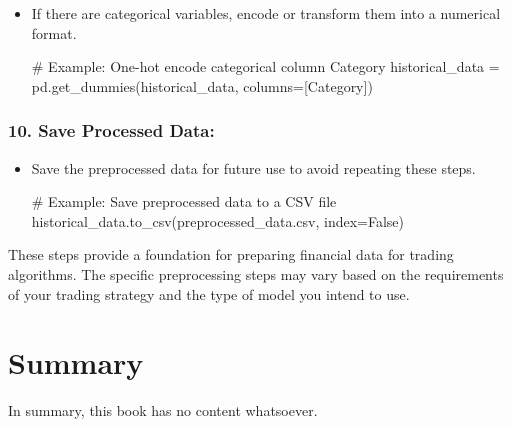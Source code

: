 \documentclass[
  letterpaper,
  DIV=11,
  numbers=noendperiod]{scrreprt}
\newenvironment{Shaded}{\begin{snugshade}}{\end{snugshade}}
\newcommand{\CommentTok}[1]{\textcolor[rgb]{0.37,0.37,0.37}{#1}}
\newcommand{\NormalTok}[1]{\textcolor[rgb]{0.00,0.23,0.31}{#1}}
\newcommand{\OperatorTok}[1]{\textcolor[rgb]{0.37,0.37,0.37}{#1}}
\newcommand{\StringTok}[1]{\textcolor[rgb]{0.13,0.47,0.30}{#1}}
\newcommand{\VariableTok}[1]{\textcolor[rgb]{0.07,0.07,0.07}{#1}}
\begin{document}
\begin{itemize}
\item
  If there are categorical variables, encode or transform them into a
  numerical format.

\begin{Shaded}
\begin{Highlighting}[]
\CommentTok{\# Example: One{-}hot encode categorical column \textquotesingle{}Category\textquotesingle{}}
\NormalTok{historical\_data }\OperatorTok{=}\NormalTok{ pd.get\_dummies(historical\_data, columns}\OperatorTok{=}\NormalTok{[}\StringTok{\textquotesingle{}Category\textquotesingle{}}\NormalTok{])}
\end{Highlighting}
\end{Shaded}
\end{itemize}

\subsection{\texorpdfstring{10. \textbf{Save Processed
Data:}}{10. Save Processed Data:}}\label{save-processed-data}

\begin{itemize}
\item
  Save the preprocessed data for future use to avoid repeating these
  steps.

\begin{Shaded}
\begin{Highlighting}[]
\CommentTok{\# Example: Save preprocessed data to a CSV file}
\NormalTok{historical\_data.to\_csv(}\StringTok{\textquotesingle{}preprocessed\_data.csv\textquotesingle{}}\NormalTok{, index}\OperatorTok{=}\VariableTok{False}\NormalTok{)}
\end{Highlighting}
\end{Shaded}
\end{itemize}

These steps provide a foundation for preparing financial data for
trading algorithms. The specific preprocessing steps may vary based on
the requirements of your trading strategy and the type of model you
intend to use.


\chapter{Summary}\label{summary}

In summary, this book has no content whatsoever.
\end{document}
